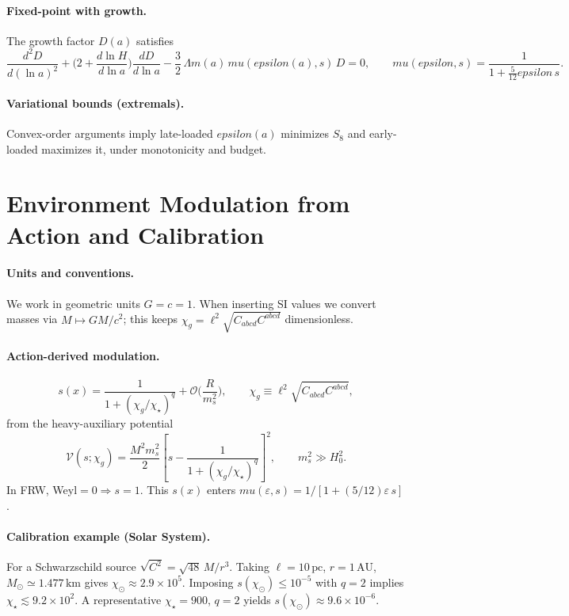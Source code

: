 \documentclass[aps,prd,onecolumn,superscriptaddress,nofootinbib]{revtex4-2}
\def\eps{epsilon}%
\def\mu{mu}%
\def\Omega_\Lambda{OmegaLambda}%
\providecommand{\eps}{\varepsilon}
\providecommand{\be}{\begin{equation}}
\providecommand{\ee}{\end{equation}}
\begin{document}
\paragraph{Fixed-point with growth.}
The growth factor \(D(a)\) satisfies
\be
\label{eq:growth-ode}
\frac{d^2 D}{d(\ln a)^2}
+\Big(2+\frac{d\ln H}{d\ln a}\Big)\frac{dD}{d\ln a}
-\frac{3}{2}\,\Omega_m(a)\,\mu(\eps(a),s)\,D=0,\qquad
\mu(\eps,s)=\frac{1}{1+\tfrac{5}{12}\eps\,s}.
\ee

\paragraph{Variational bounds (extremals).}
Convex-order arguments imply late-loaded \(\eps(a)\) minimizes \(S_8\) and early-loaded maximizes it, under monotonicity and budget.

\section{Environment Modulation from Action and Calibration}
\label{sec:env}
\paragraph{Units and conventions.}
We work in geometric units \(G=c=1\). When inserting SI values we convert masses via \(M\mapsto GM/c^2\); this keeps \(\chi_g=\ell^2\sqrt{C_{abcd}C^{abcd}}\) dimensionless.

\paragraph{Action-derived modulation.}
\be
s(x)=\frac{1}{1+(\chi_g/\chi_\star)^q}+\mathcal O\!\Big(\frac{R}{m_s^2}\Big),\qquad \chi_g\equiv \ell^2\sqrt{C_{abcd}C^{abcd}},
\ee
from the heavy-auxiliary potential
\be
\mathcal V(s;\chi_g)=\frac{M^2 m_s^2}{2}\left[s-\frac{1}{1+(\chi_g/\chi_\star)^q}\right]^2,\qquad m_s^2\gg H_0^2.
\ee
In FRW, Weyl\(=0\Rightarrow s=1\). This \(s(x)\) enters \(\mu(\varepsilon,s)=1/[1+(5/12)\varepsilon\,s]\).

\paragraph{Calibration example (Solar System).}
For a Schwarzschild source \(\sqrt{C^2}=\sqrt{48}\,M/r^3\). Taking \(\ell=10\,\mathrm{pc}\), \(r=1\,\mathrm{AU}\), \(M_\odot\simeq 1.477\,\mathrm{km}\) gives
\(\chi_\odot \approx 2.9\times 10^{5}\).
Imposing \(s(\chi_\odot)\le 10^{-5}\) with \(q=2\) implies \(\chi_\star \lesssim 9.2\times 10^{2}\).
A representative \(\chi_\star=900\), \(q=2\) yields \(s(\chi_\odot)\approx 9.6\times 10^{-6}\).
\end{document}
